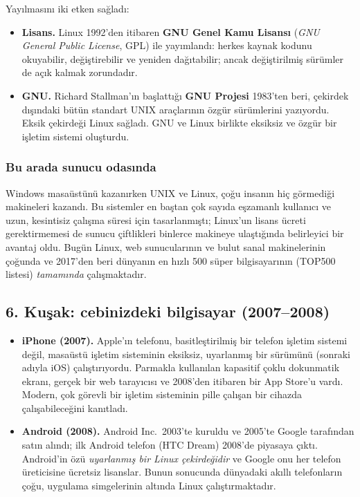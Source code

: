 \documentclass[11pt,a4paper]{article}
\begin{document}
Yayılmasını iki etken sağladı:
\begin{itemize}
  \item \textbf{Lisans.} Linux 1992'den itibaren \textbf{GNU Genel Kamu Lisansı} (\emph{GNU General Public License}, GPL) ile yayımlandı: herkes kaynak kodunu okuyabilir, değiştirebilir ve yeniden dağıtabilir; ancak değiştirilmiş sürümler de açık kalmak zorundadır.
  \item \textbf{GNU.} Richard Stallman'ın başlattığı \textbf{GNU Projesi} 1983'ten beri, çekirdek dışındaki bütün standart UNIX araçlarının özgür sürümlerini yazıyordu. Eksik çekirdeği Linux sağladı. GNU ve Linux birlikte eksiksiz ve özgür bir işletim sistemi oluşturdu.
\end{itemize}

\subsubsection{Bu arada sunucu odasında}
Windows masaüstünü kazanırken UNIX ve Linux, çoğu insanın hiç görmediği makineleri kazandı. Bu sistemler en baştan çok sayıda eşzamanlı kullanıcı ve uzun, kesintisiz çalışma süresi için tasarlanmıştı; Linux'un lisans ücreti gerektirmemesi de sunucu çiftlikleri binlerce makineye ulaştığında belirleyici bir avantaj oldu. Bugün Linux, web sunucularının ve bulut sanal makinelerinin çoğunda ve 2017'den beri dünyanın en hızlı 500 süper bilgisayarının (TOP500 listesi) \emph{tamamında} çalışmaktadır.

\subsection{6. Kuşak: cebinizdeki bilgisayar (2007--2008)}

\begin{itemize}
  \item \textbf{iPhone (2007).} Apple'ın telefonu, basitleştirilmiş bir telefon işletim sistemi değil, masaüstü işletim sisteminin eksiksiz, uyarlanmış bir sürümünü (sonraki adıyla iOS) çalıştırıyordu. Parmakla kullanılan kapasitif çoklu dokunmatik ekranı, gerçek bir web tarayıcısı ve 2008'den itibaren bir App Store'u vardı. Modern, çok görevli bir işletim sisteminin pille çalışan bir cihazda çalışabileceğini kanıtladı.
  \item \textbf{Android (2008).} Android Inc.\ 2003'te kuruldu ve 2005'te Google tarafından satın alındı; ilk Android telefon (HTC Dream) 2008'de piyasaya çıktı. Android'in özü \emph{uyarlanmış bir Linux çekirdeğidir} ve Google onu her telefon üreticisine ücretsiz lisanslar. Bunun sonucunda dünyadaki akıllı telefonların çoğu, uygulama simgelerinin altında Linux çalıştırmaktadır.
\end{itemize}
\end{document}
